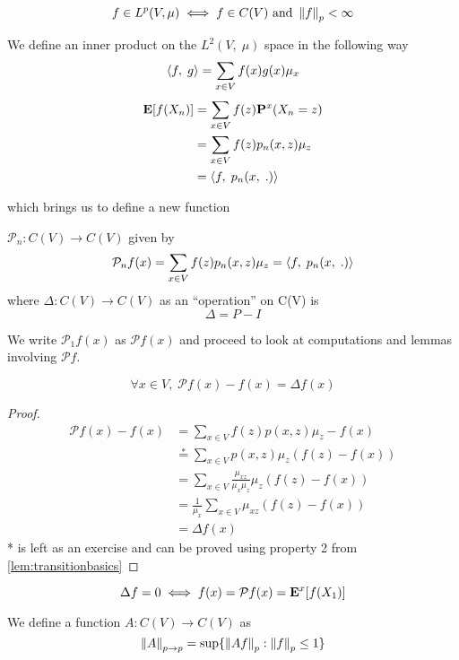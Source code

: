 \documentclass[main]{subfiles}
\begin{document}
$$f \in L^p(V,\mu) \iff f \in C(V)\text{ and }\left\lVert f\right\rVert_{p} < \infty$$
\begin{definition}
    We define an inner product on the $L^2(V,\;\mu)$ space in the following way
    $$\left\langle f,\;g\right\rangle = \sum_{x \in V} f(x)g(x)\mu_x$$
    \begin{align*}
        \mathbf E[f(X_n)] & = \sum_{x \in V}f(z) \mathbf P^x(X_n = z) \\
                   & = \sum_{x \in V}f(z) p_n(x,z)\mu_z \\
                   & = \left\langle f,\;p_n(x,\;.)\right\rangle               \\
    \end{align*}
\end{definition}
which brings us to define a new function
\begin{definition}
    $\mathcal{P}_n: C(V) \to C(V)$ given by
    $$\mathcal{P}_nf(x) = \sum_{x \in V}f(z) p_n(x,z)\mu_z = \left\langle f,\;p_n(x,\;.)\right\rangle$$
    where $\Delta: C(V) \to C(V)$ as an ``operation'' on C(V) is
    $$\Delta  = P - I$$
\end{definition}
We write $\mathcal{P}_1f(x)$ as $\mathcal{P}f(x)$ and proceed to look at computations and lemmas involving $\mathcal{P}f$.
\begin{lemma}
    $$\forall x \in V,\;\mathcal{P}f(x) - f(x) = \Delta f(x)$$
    \begin{proof}
        \begin{align*}
            \mathcal{P}f(x) - f(x) & = \sum_{x \in V}f(z) p(x,z)\mu_z - f(x)                           \\
                                   & \stackrel{*}{=} \sum_{x \in V}p(x,z)\mu_z(f(z) - f(x))            \\
                                   & = \sum_{x \in V}\frac{\mu_{xz}}{\mu_{x}\mu_{z}}\mu_z(f(z) - f(x)) \\
                                   & = \frac{1}{\mu_{x}}\sum_{x \in V}\mu_{xz}(f(z) - f(x))            \\
                                   & = \Delta f(x)
        \end{align*}
        * is left as an exercise and can be proved using property 2 from \eqref{lem:transitionbasics}
    \end{proof}
\end{lemma}
\begin{corollary}
    $$\Delta f = 0 \iff f(x) = \mathcal{P}f(x) = \mathbf E^x[f(X_1)]$$
\end{corollary}
\vspace{1em}
\begin{definition}
    We define a function $A: C(V) \to C(V)$ as
    $$\left\lVert A\right\rVert_{p \to p} = \sup\{\left\lVert Af\right\rVert_{p}: \left\lVert f\right\rVert_{p} \leq 1\}$$
\end{definition}
\end{document}
